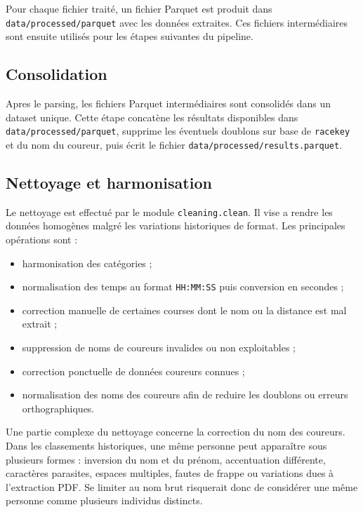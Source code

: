 \documentclass[12pt,a4paper]{article}
\begin{document}
Pour chaque fichier traité, un fichier Parquet est produit dans \texttt{data/processed/parquet} avec les données extraites. Ces fichiers intermédiaires sont ensuite utilisés pour les étapes suivantes du pipeline.

\subsection{Consolidation}

Apres le parsing, les fichiers Parquet intermédiaires sont consolidés dans un dataset unique. Cette étape concatène les résultats disponibles dans \texttt{data/processed/parquet}, supprime les éventuels doublons sur base de \texttt{racekey} et du nom du coureur, puis écrit le fichier \texttt{data/processed/results.parquet}.

\subsection{Nettoyage et harmonisation}

Le nettoyage est effectué par le module \texttt{cleaning.clean}. Il vise a rendre les données homogènes malgré les variations historiques de format. Les principales opérations sont :

\begin{itemize}
    \item harmonisation des catégories ;
    \item normalisation des temps au format \texttt{HH:MM:SS} puis conversion en secondes ;
    \item correction manuelle de certaines courses dont le nom ou la distance est mal extrait ;
    \item suppression de noms de coureurs invalides ou non exploitables ;
    \item correction ponctuelle de données coureurs connues ;
    \item normalisation des noms des coureurs afin de reduire les doublons ou erreurs orthographiques.
\end{itemize}

Une partie complexe du nettoyage concerne la correction du nom des coureurs. Dans les classements historiques, une même personne peut apparaître sous plusieurs formes : inversion du nom et du prénom, accentuation différente, caractères parasites, espaces multiples, fautes de frappe ou variations dues à l'extraction PDF. Se limiter au nom brut risquerait donc de considérer une même personne comme plusieurs individus distincts.
\end{document}

